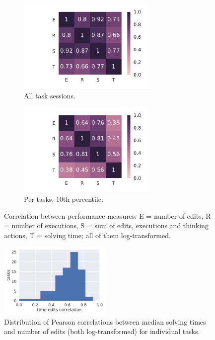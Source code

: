 \begin{figure}[htb]
\centering
\begin{subfigure}{.49\textwidth}
\centering
\includegraphics[height=45mm,trim={34mm 0 11mm 0},clip]{img/performance-corr-ts}
\caption{All task sessions.}
\label{fig:performance-corrs-ts}
\end{subfigure}
\begin{subfigure}{.49\textwidth}
\centering
\includegraphics[height=45mm,trim={34mm 0 11mm 0},clip]{img/performance-corr-tasks-q10}
\caption{Per tasks, 10th percentile.}
\label{fig:performance-corrs-p10}
\end{subfigure}
\caption{Correlation between performance measures:
E = number of edits, R = number of executions, S = sum of edits, executions and thinking actions,
T = solving time; all of them log-transformed.}
\label{fig:performance-corrs}
\end{figure}


\begin{figure}[htb]
\centering
\includegraphics[width=0.48\textwidth]{img/time-edits-corr}
\caption{%
  Distribution of Pearson correlations between median solving times and number
  of edits (both log-transformed) for individual tasks.} %
\label{fig:time-vs-edits}
\end{figure}


